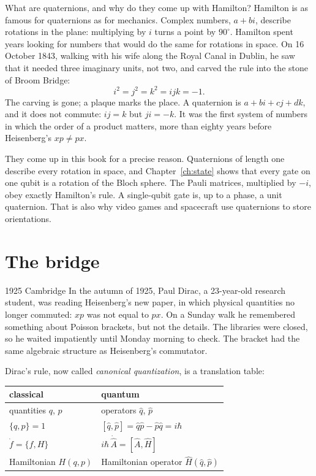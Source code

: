 \begin{question}{What are quaternions, and why do they come up with Hamilton?}
Hamilton is as famous for quaternions as for mechanics. Complex numbers, $a + bi$,
describe rotations in the plane: multiplying by $i$ turns a point by $90^\circ$.
Hamilton spent years looking for numbers that would do the same for rotations in
space. On 16 October 1843, walking with his wife along the Royal Canal in Dublin, he
saw that it needed three imaginary units, not two, and carved the rule into the stone
of Broom Bridge:
\[
  i^2 = j^2 = k^2 = ijk = -1 .
\]
The carving is gone; a plaque marks the place. A quaternion is
$a + bi + cj + dk$, and it does not commute: $ij = k$ but $ji = -k$. It was the first
system of numbers in which the order of a product matters, more than eighty years
before Heisenberg's $xp \neq px$.

They come up in this book for a precise reason. Quaternions of length one describe
every rotation in space, and Chapter~\ref{ch:state} shows that every gate on one
qubit is a rotation of the Bloch sphere. The Pauli matrices, multiplied by $-i$,
obey exactly Hamilton's rule. A single-qubit gate is, up to a phase, a unit
quaternion. That is also why video games and spacecraft use quaternions to store
orientations.
\end{question}

\section{The bridge}

\begin{history}{1925 \textperiodcentered{} Cambridge}
In the autumn of 1925, Paul Dirac, a 23-year-old research student, was reading
Heisenberg's new paper, in which physical quantities no longer commuted: $xp$ was
not equal to $px$. On a Sunday walk he remembered something about Poisson
brackets, but not the details. The libraries were closed, so he waited
impatiently until Monday morning to check. The bracket had the same algebraic
structure as Heisenberg's commutator.
\end{history}

Dirac's rule, now called \emph{canonical quantization}, is a translation table:

\begin{center}
\begin{tabular}{ll}
\hline
classical & quantum \\
\hline
quantities $q$, $p$ & operators $\hat q$, $\hat p$ \\
$\{q, p\} = 1$ & $[\hat q, \hat p] = \hat q\hat p - \hat p\hat q = i\hbar$ \\
$\dot f = \{f, H\}$ & $i\hbar\,\dot{\hat A} = [\hat A, \hat H]$ \\
Hamiltonian $H(q, p)$ & Hamiltonian operator $\hat H(\hat q, \hat p)$ \\
\hline
\end{tabular}
\end{center}


